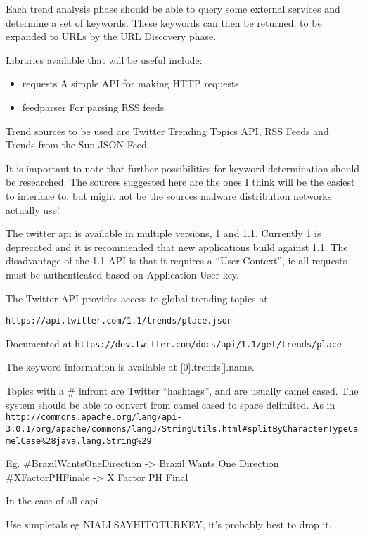 Each trend analysis phase should be able to query some external services and determine a set of keywords. These keywords can then be returned, to be expanded to URLs by the URL Discovery phase.

Libraries available that will be useful include:

\begin{itemize}
    \item requests A simple API for making HTTP requests
    \item feedparser For parsing RSS feeds
\end{itemize}

Trend sources to be used are Twitter Trending Topics API, RSS Feeds and Trends from the Sun JSON Feed.



It is important to note that further possibilities for keyword determination should be researched. The sources suggested here are the ones I think will be the easiest to interface to, but might not be the sources malware distribution networks actually use!

The twitter api is available in multiple versions, 1 and 1.1. Currently 1 is deprecated and it is recommended that new applications build against 1.1.  The disadvantage of the 1.1 API is that it requires a ``User Context'', ie all requests must be authenticated based on Application-User key.

The Twitter API provides access to global trending topics at

\verb`https://api.twitter.com/1.1/trends/place.json`

Documented at \verb`https://dev.twitter.com/docs/api/1.1/get/trends/place`

The keyword information is available at [0].trends[].name.

Topics with a \# infront are Twitter ``hashtags'', and are usually camel cased. The system should be able to convert from camel cased to space delimited. As in \verb`http://commons.apache.org/lang/api-3.0.1/org/apache/commons/lang3/StringUtils.html#splitByCharacterTypeCamelCase%28java.lang.String%29`

Eg. \#BrazilWantsOneDirection -> Brazil Wants One Direction
\#XFactorPHFinale -> X Factor PH Final

In the case of all capi
    \item Use simpletals eg NIALLSAYHITOTURKEY, it's probably best to drop it.


